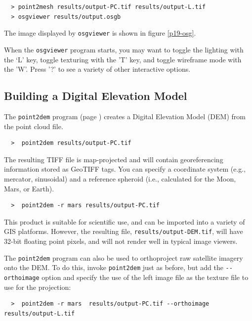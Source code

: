 \begin{verbatim}
  > point2mesh results/output-PC.tif results/output-L.tif
  > osgviewer results/output.osgb
\end{verbatim}

The image displayed by \texttt{osgviewer} is shown in figure \ref{p19-osg}.

When the \texttt{osgviewer} program starts, you may want to toggle the
lighting with the `L' key, toggle texturing with the 'T' key, and
toggle wireframe mode with the 'W'.  Press '?' to see a variety of
other interactive options.

\subsection{Building a Digital Elevation Model}
\label{builddem}

The \texttt{point2dem} program (page \pageref{point2dem}) creates a
Digital Elevation Model (\ac{DEM}) from the point cloud file.

\begin{verbatim}
  >  point2dem results/output-PC.tif
\end{verbatim}

The resulting TIFF file is map-projected and will contain
georeferencing information stored as GeoTIFF tags. You can specify a
coordinate system (e.g., mercator, sinusoidal) and a reference
spheroid (i.e., calculated for the Moon, Mars, or Earth).

\begin{verbatim}
  >  point2dem -r mars results/output-PC.tif
\end{verbatim}

This product is suitable for scientific use, and can be imported into
a variety of GIS platforms.  However, the resulting file,
\texttt{results/output-DEM.tif}, will have 32-bit floating point
pixels, and will not render well in typical image viewers.

The \texttt{point2dem} program can also be used to orthoproject raw
satellite imagery onto the \ac{DEM}. To do this, invoke
\texttt{point2dem} just as before, but add the \texttt{-\/-orthoimage}
option and specify the use of the left image file as the texture file
to use for the projection:

\begin{verbatim}
  >  point2dem -r mars  results/output-PC.tif --orthoimage results/output-L.tif
\end{verbatim}

